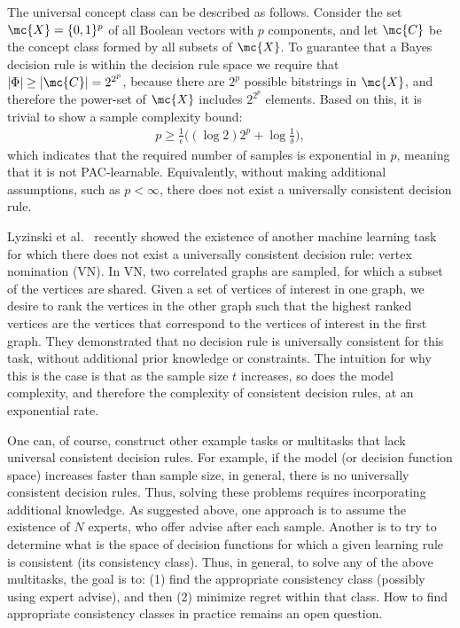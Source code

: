\documentclass{article}
\begin{document}
The universal concept class can be described as follows.  Consider the set $\mc{X}=\{0,1\}^p$ of all Boolean vectors with $p$ components, and let $\mc{C}$ be the concept class formed by all subsets of $\mc{X}$.  To guarantee that a Bayes decision rule is within the decision rule space we require that $|\Phi| \geq |\mc{C}| = 2^{2^p}$, because there are $2^p$ possible bitstrings in $\mc{X}$, and therefore the power-set of $\mc{X}$ includes $2^{2^p}$ elements.  Based on this, it is trivial to show a sample complexity bound:
\begin{align}
    p \geq \frac{1}{\epsilon} \big(  (\log 2) 2^p + \log \frac{1}{\delta} \big),
\end{align}
which indicates that the required number of samples is exponential in $p$, meaning that it is not PAC-learnable.  Equivalently, without making additional assumptions, such as $p < \infty$, there does not exist a universally consistent decision rule. 



Lyzinski et al.~\cite{Lyzinski2017-jh} recently showed the existence of another machine learning task for which there does not exist a universally consistent decision rule: vertex nomination (VN).  In VN,  two correlated graphs are sampled, for which a subset of the vertices are shared.  Given a set of vertices of interest in one graph, we desire to rank the vertices in the other graph such that the highest ranked vertices are the vertices that correspond to the vertices of interest in the first graph.  They demonstrated that no decision rule is universally consistent for this task, without  additional prior knowledge or constraints.   The intuition for why this is the case is that as the sample size $t$ increases, so does the model complexity, and therefore the complexity of consistent decision rules, at an exponential rate.


One can, of course, construct other example tasks or multitasks that lack universal consistent decision rules.  For example, if the model (or decision function space) increases faster than sample size, in general, there is no universally consistent decision rules.  Thus, solving these problems requires incorporating additional knowledge.  As suggested above, one approach is to assume the existence of $N$ experts, who offer advise after each sample.  Another is to try to determine what is the space of decision functions for which a given learning rule is consistent (its consistency class). 
Thus, in general, to solve any of the above multitasks, the goal is to: (1) find the appropriate consistency class (possibly using expert advise), and then (2) minimize regret within that class.  How to find appropriate consistency classes  in practice remains an open question.
\end{document}

